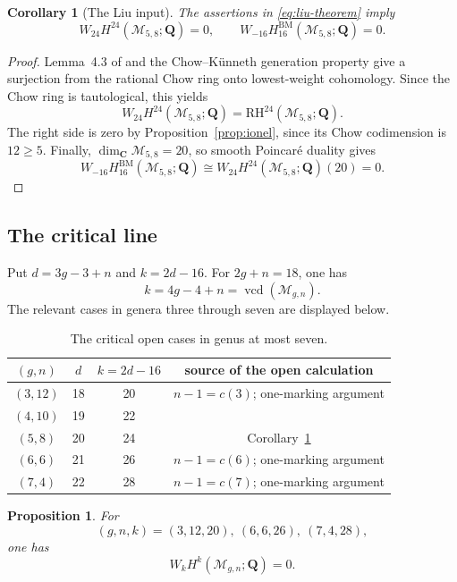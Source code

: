 \documentclass[12pt,reqno]{amsart}
\newcommand{\Q}{\mathbf{Q}}
\newcommand{\C}{\mathbf{C}}
\newcommand{\M}{\mathcal{M}}
\newcommand{\BM}{\mathrm{BM}}
\newcommand{\RH}{\mathrm{RH}}
\newcommand{\vcd}{\operatorname{vcd}}
\newtheorem{proposition}[theorem]{Proposition}
\newtheorem{corollary}[theorem]{Corollary}
\theoremstyle{definition}
\theoremstyle{remark}
\begin{document}
\begin{corollary}[The Liu input]\label{cor:liu-input}
The assertions in \eqref{eq:liu-theorem} imply
\begin{equation}\label{eq:liu-consequence}
 W_{24}H^{24}(\M_{5,8};\Q)=0,
 \qquad
 W_{-16}H^{\BM}_{16}(\M_{5,8};\Q)=0.
\end{equation}
\end{corollary}

\begin{proof}
Lemma~4.3 of \cite{CLP} and the Chow--K\"unneth generation property give a
surjection from the rational Chow ring onto lowest-weight cohomology.
Since the Chow ring is tautological, this yields
\[
 W_{24}H^{24}(\M_{5,8};\Q)=\RH^{24}(\M_{5,8};\Q).
\]
The right side is zero by Proposition~\ref{prop:ionel}, since its Chow
codimension is $12\geq5$.  Finally, $\dim_{\C}\M_{5,8}=20$, so smooth
Poincar\'e duality gives
\[
 W_{-16}H^{\BM}_{16}(\M_{5,8};\Q)
 \cong W_{24}H^{24}(\M_{5,8};\Q)(20)=0.
\]
\end{proof}

\subsection{The critical line}

Put $d=3g-3+n$ and $k=2d-16$.  For $2g+n=18$, one has
\begin{equation}\label{eq:critical-arithmetic}
 k=4g-4+n=\vcd(\M_{g,n}).
\end{equation}
The relevant cases in genera three through seven are displayed below.

\begin{table}[ht]
\centering
\caption{The critical open cases in genus at most seven.}
\label{tab:critical}
\small
\begin{tabular}{@{}cccc@{}}
\toprule
$(g,n)$&$d$&$k=2d-16$&source of the open calculation\\
\midrule
$(3,12)$&18&20&$n-1=c(3)$; one-marking argument\\
$(4,10)$&19&22&\cite[Proposition~4.5]{CLP}\\
$(5,8)$ &20&24&Corollary~\ref{cor:liu-input}\\
$(6,6)$ &21&26&$n-1=c(6)$; one-marking argument\\
$(7,4)$ &22&28&$n-1=c(7)$; one-marking argument\\
\bottomrule
\end{tabular}
\end{table}

\begin{proposition}\label{prop:endpoint-vanishing}
For
\[
 (g,n,k)=(3,12,20),\ (6,6,26),\ (7,4,28),
\]
one has
\begin{equation}\label{eq:endpoint-zero}
 W_kH^k(\M_{g,n};\Q)=0.
\end{equation}
\end{proposition}
\end{document}
